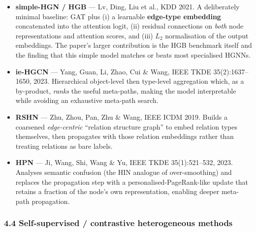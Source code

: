 \begin{itemize}
  Key/Query/Value, and attention and message matrices are indexed by the \emph{meta-relation}
  $\langle\tau(s),\phi(e),\tau(t)\rangle$, with a learnable scalar prior $\mu$ per meta-relation.
  It needs no hand-designed meta-paths. Adds \emph{relative temporal encoding} for dynamic graphs
  and \emph{HGSampling} for web-scale mini-batch training.
\item \textbf{simple-HGN / HGB} --- Lv, Ding, Liu et al., KDD 2021. A deliberately minimal
  baseline: GAT plus (i) a learnable \textbf{edge-type embedding} concatenated into the attention
  logit, (ii) residual connections on \emph{both} node representations and attention scores, and
  (iii) $L_2$ normalisation of the output embeddings. The paper's larger contribution is the HGB
  benchmark itself and the finding that this simple model matches or beats most specialised HGNNs.
\item \textbf{ie-HGCN} --- Yang, Guan, Li, Zhao, Cui \& Wang, IEEE TKDE 35(2):1637--1650, 2023.
  Hierarchical object-level then type-level aggregation which, as a by-product, \emph{ranks} the
  useful meta-paths, making the model interpretable while avoiding an exhaustive meta-path search.
\item \textbf{RSHN} --- Zhu, Zhou, Pan, Zhu \& Wang, IEEE ICDM 2019. Builds a coarsened
  \emph{edge-centric} ``relation structure graph'' to embed relation types themselves, then
  propagates with those relation embeddings rather than treating relations as bare labels.
\item \textbf{HPN} --- Ji, Wang, Shi, Wang \& Yu, IEEE TKDE 35(1):521--532, 2023. Analyses
  semantic confusion (the HIN analogue of over-smoothing) and replaces the propagation step with a
  personalised-PageRank-like update that retains a fraction of the node's own representation,
  enabling deeper meta-path propagation.
\end{itemize}

\subsubsection*{4.4 Self-supervised / contrastive heterogeneous methods}

